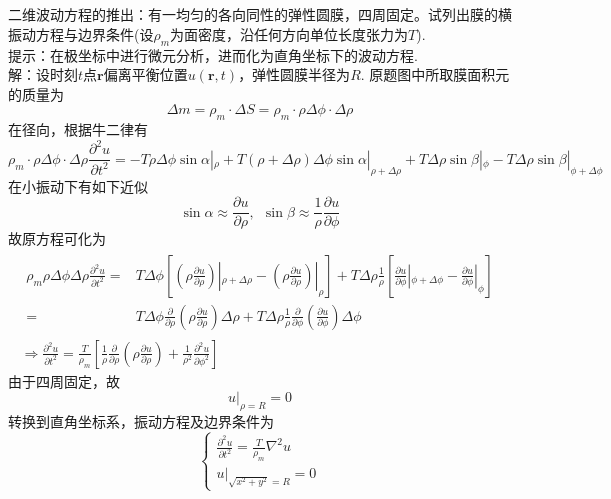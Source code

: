 \documentclass[10pt,a4paper]{article}
\begin{document}
\section{}
二维波动方程的推出：有一均匀的各向同性的弹性圆膜，四周固定。试列出膜的横振动方程与边界条件(设$\rho_m$为面密度，沿任何方向单位长度张力为$T$).\\
提示：在极坐标中进行微元分析，进而化为直角坐标下的波动方程.\\
解：设时刻$t$点$\bm{r}$偏离平衡位置$u(\bm{r},t)$，弹性圆膜半径为$R$. 原题图中所取膜面积元的质量为
\[
\Delta m=\rho_m\cdot\Delta S=\rho_m\cdot\rho\Delta\phi\cdot\Delta\rho
\]
在径向，根据牛二律有
\[
\rho_m\cdot\rho\Delta\phi\cdot\Delta\rho\frac{\partial^2u}{\partial t^2}=-T\rho\Delta\phi\sin\alpha|_{\rho}+T(\rho+\Delta\rho)\Delta\phi\sin\alpha|_{\rho+\Delta\rho}+T\Delta\rho\sin\beta|_{\phi}-T\Delta\rho\sin\beta|_{\phi+\Delta\phi}
\]
在小振动下有如下近似
\[
\sin\alpha\approx\frac{\partial u}{\partial\rho},~~\sin\beta\approx\frac{1}{\rho}\frac{\partial u}{\partial\phi}
\]
故原方程可化为
\begin{gather*}
\begin{align*}
\rho_m\rho\Delta\phi\Delta\rho\frac{\partial^2u}{\partial t^2}=&T\Delta\phi[(\rho\frac{\partial u}{\partial\rho})|_{\rho+\Delta\rho}-(\rho\frac{\partial u}{\partial\rho})|_{\rho}]+T\Delta\rho\frac{1}{\rho}[\frac{\partial u}{\partial\phi}|_{\phi+\Delta\phi}-\frac{\partial u}{\partial\phi}|_{\phi}]\\
=&T\Delta\phi\frac{\partial}{\partial\rho}(\rho\frac{\partial u}{\partial\rho})\Delta\rho+T\Delta\rho\frac{1}{\rho}\frac{\partial}{\partial\phi}(\frac{\partial u}{\partial\phi})\Delta\phi
\end{align*}\\
\Longrightarrow\frac{\partial^2u}{\partial t^2}=\frac{T}{\rho_m}[\frac{1}{\rho}\frac{\partial}{\partial\rho}(\rho\frac{\partial u}{\partial\rho})+\frac{1}{\rho^2}\frac{\partial^2u}{\partial\phi^2}]
\end{gather*}
由于四周固定，故
\[
u|_{\rho=R}=0
\]
转换到直角坐标系，振动方程及边界条件为
\[
\left\{\begin{array}{l}
\frac{\partial^2u}{\partial t^2}=\frac{T}{\rho_m}\nabla^2u\\
u|_{\sqrt{x^2+y^2}=R}=0
\end{array}\right.
\]
\end{document}
